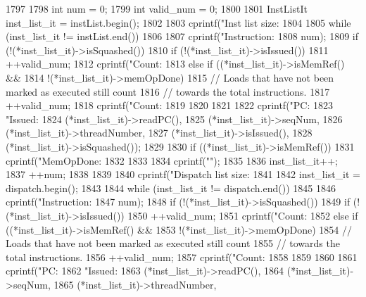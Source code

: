\begin{DoxyCode}
1797 {
1798     int num = 0;
1799     int valid_num = 0;
1800 
1801     InstListIt inst_list_it = instList.begin();
1802 
1803     cprintf("Inst list size: %
1804 
1805     while (inst_list_it != instList.end())
1806     {
1807         cprintf("Instruction:%
1808                 num);
1809         if (!(*inst_list_it)->isSquashed()) {
1810             if (!(*inst_list_it)->isIssued()) {
1811                 ++valid_num;
1812                 cprintf("Count:%
1813             } else if ((*inst_list_it)->isMemRef() &&
1814                        !(*inst_list_it)->memOpDone) {
1815                 // Loads that have not been marked as executed still count
1816                 // towards the total instructions.
1817                 ++valid_num;
1818                 cprintf("Count:%
1819             }
1820         }
1821 
1822         cprintf("PC:%
1823                 "Issued:%
1824                 (*inst_list_it)->readPC(),
1825                 (*inst_list_it)->seqNum,
1826                 (*inst_list_it)->threadNumber,
1827                 (*inst_list_it)->isIssued(),
1828                 (*inst_list_it)->isSquashed());
1829 
1830         if ((*inst_list_it)->isMemRef()) {
1831             cprintf("MemOpDone:%
1832         }
1833 
1834         cprintf("\n");
1835 
1836         inst_list_it++;
1837         ++num;
1838     }
1839 
1840     cprintf("Dispatch list size: %
1841 
1842     inst_list_it = dispatch.begin();
1843 
1844     while (inst_list_it != dispatch.end())
1845     {
1846         cprintf("Instruction:%
1847                 num);
1848         if (!(*inst_list_it)->isSquashed()) {
1849             if (!(*inst_list_it)->isIssued()) {
1850                 ++valid_num;
1851                 cprintf("Count:%
1852             } else if ((*inst_list_it)->isMemRef() &&
1853                        !(*inst_list_it)->memOpDone) {
1854                 // Loads that have not been marked as executed still count
1855                 // towards the total instructions.
1856                 ++valid_num;
1857                 cprintf("Count:%
1858             }
1859         }
1860 
1861         cprintf("PC:%
1862                 "Issued:%
1863                 (*inst_list_it)->readPC(),
1864                 (*inst_list_it)->seqNum,
1865                 (*inst_list_it)->threadNumber,
}}
\end{DoxyCode}
